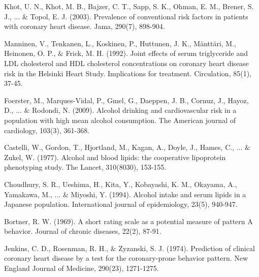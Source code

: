 \documentclass{article}
\begin{document}
\vspace{-1em}
{\fontsize{8pt}{10.8pt}\selectfont [11] Khot, U. N., Khot, M. B., Bajzer, C. T., Sapp, S. K., Ohman, E. M., Brener, S. J., ... $\&$  Topol, E. J. (2003). Prevalence of conventional risk factors in patients with coronary heart disease. Jama, 290(7), 898-904.\par}
\vspace{-1em}
{\fontsize{8pt}{10.8pt}\selectfont [12] Manninen, V., Tenkanen, L., Koskinen, P., Huttunen, J. K., Mänttäri, M., Heinonen, O. P., $\&$  Frick, M. H. (1992). Joint effects of serum triglyceride and LDL cholesterol and HDL cholesterol concentrations on coronary heart disease risk in the Helsinki Heart Study. Implications for treatment. Circulation, 85(1), 37-45.\par}
\vspace{-1em}
{\fontsize{8pt}{10.8pt}\selectfont [13] Foerster, M., Marques-Vidal, P., Gmel, G., Daeppen, J. B., Cornuz, J., Hayoz, D., ... $\&$  Rodondi, N. (2009). Alcohol drinking and cardiovascular risk in a population with high mean alcohol consumption. The American journal of cardiology, 103(3), 361-368.\par}
\vspace{-1em}
{\fontsize{8pt}{10.8pt}\selectfont [14] Castelli, W., Gordon, T., Hjortland, M., Kagan, A., Doyle, J., Hames, C., ... $\&$  Zukel, W. (1977). Alcohol and blood lipids: the cooperative lipoprotein phenotyping study. The Lancet, 310(8030), 153-155.\par}
\vspace{-1em}
{\fontsize{8pt}{10.8pt}\selectfont [15] Choudhury, S. R., Ueshima, H., Kita, Y., Kobayashi, K. M., Okayama, A., Yamakawa, M., ... $\&$  Miyoshi, Y. (1994). Alcohol intake and serum lipids in a Japanese population. International journal of epidemiology, 23(5), 940-947.\par}
\vspace{-1em}
{\fontsize{8pt}{10.8pt}\selectfont [16] Bortner, R. W. (1969). A short rating scale as a potential measure of pattern A behavior. Journal of chronic diseases, 22(2), 87-91.\par}
\vspace{-1em}
{\fontsize{8pt}{10.8pt}\selectfont [17] Jenkins, C. D., Rosenman, R. H., $\&$  Zyzanski, S. J. (1974). Prediction of clinical coronary heart disease by a test for the coronary-prone behavior pattern. New England Journal of Medicine, 290(23), 1271-1275.\par}
\vspace{-1em}
\end{document}
